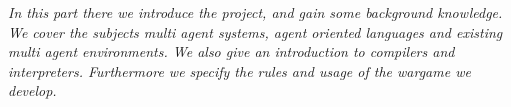 \textit{In this part there we introduce the project, and gain some background knowledge. We cover the subjects multi agent systems, agent oriented languages and existing multi agent environments. We also give an introduction to compilers and interpreters. Furthermore we specify the rules and usage of the wargame we develop.} \\ \\
